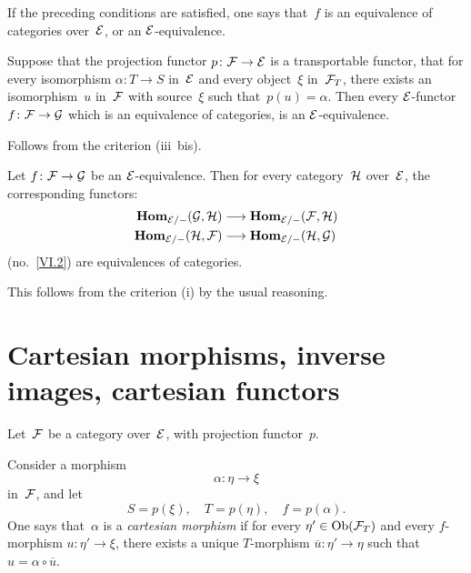 \begin{definition}
\label{VI.4.3} If the preceding conditions are
satisfied, one says that~$f$ is an equivalence of
categories over~$\cal{E}$, or an $\cal{E}$-equivalence.
\end{definition}

\begin{corollary}
\label{VI.4.4} Suppose that the projection functor $p\colon
\cal{F}\to\cal{E}$ is a transportable functor, \ie that for every
isomorphism $\alpha\colon T \to S$ in~$\cal{E}$ and every object~$\xi$
in~$\cal{F}_T$, there exists an isomorphism~$u$ in~$\cal{F}$ with
source~$\xi$ such that~$p(u)=\alpha$. Then every $\cal{E}$-functor
$f\colon \cal{F}\to\cal{G}$ which is an equivalence of
categories, is an $\cal{E}$-equivalence.
\end{corollary}

Follows
from the criterion (iii~bis).

\begin{corollary}
\label{VI.4.5} Let $f\colon \cal{F}\to\cal{G}$ be an
$\cal{E}$-equivalence. Then for every category~$\cal{H}$
over~$\cal{E}$, the corresponding functors:
\begin{align*}
\SheafHom_{\cal{E}/-}(\cal{G},\cal{H}) & \to
\SheafHom_{\cal{E}/-}(\cal{F},\cal{H}) \\
\SheafHom_{\cal{E}/-}(\cal{H},\cal{F})
& \to \SheafHom_{\cal{E}/-}(\cal{H},\cal{G})
\end{align*}
(\cf no.~\ref{VI.2}) are equivalences of categories.
\end{corollary}

This follows from the criterion (i) by the usual reasoning.

\section{Cartesian morphisms, inverse images, cartesian functors}
\label{VI.5}

Let~$\cal{F}$ be a category over~$\cal{E}$, with
projection functor~$p$.

\begin{definition}
\label{VI.5.1} Consider a morphism
$$
\alpha\colon \eta\to\xi
$$
in~$\cal{F}$, and let
$$
S = p(\xi), \quad T = p(\eta), \quad f=p(\alpha).
$$
One says that~$\alpha$ is a \emph{cartesian morphism}
if for every $\eta' \in \Ob(\cal{F}_T)$ and every $f$-morphism $u\colon
\eta'\to\xi$, there exists a unique $T$-morphism $\overline{u}\colon
\eta'\to\eta$ such that~$u=\alpha\circ\overline{u}$.
\end{definition}

